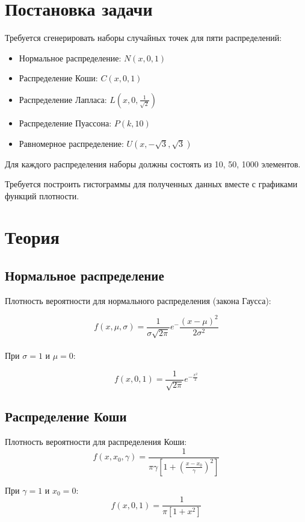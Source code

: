 \section{Постановка задачи}
Требуется сгенерировать наборы случайных точек для пяти распределений:
\begin{itemize}
\item Нормальное распределение: $N(x, 0, 1)$
\item Распределение Коши: $C(x, 0, 1)$
\item Распределение Лапласа: $L(x, 0, \frac{1}{\sqrt{2}})$
\item Распределение Пуассона: $P(k, 10)$
\item Равномерное распределение: $U(x, -\sqrt{3}, \sqrt{3})$
\end{itemize}
Для каждого распределения наборы должны состоять из 10, 50, 1000 элементов. 

Требуется построить гистограммы для полученных данных вместе с графиками функций плотности.


\section{Теория}
\subsection{Нормальное распределение}
Плотность вероятности для нормального распределения (закона Гаусса):

\begin{equation}
  f(x, \mu, \sigma) = \frac{1}{{\sigma \sqrt {2\pi } }}e^-\frac{ \left( {x - \mu } \right)^2 } {2\sigma ^2 }
\end{equation}
 \\

При \( \sigma = 1 \) и \( \mu = 0 \):

\begin{equation}
  f(x, 0, 1) = \frac{1}{ \sqrt {2\pi } }e^{-\frac{{x}^2 }{2}}
\end{equation}


\subsection{Распределение Коши}
Плотность вероятности для распределения Коши:
$$
f(x, {x_0}, \gamma) =  \frac{1}{\pi\gamma \left[1 + \left(\frac{x-x_0}{\gamma}\right)^2\right]}
$$

При \( \gamma = 1 \) и \( x_0 = 0 \):
$$
f(x, 0, 1) =  \frac{1}{\pi \left[1 + {x}^2\right]}
$$


